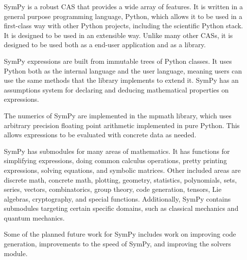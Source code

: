 SymPy is a robust CAS that provides a wide array of features. It is written in
a general purpose programming language, Python, which allows it to be used in
a first-class way with other Python projects, including the scientific Python
stack. It is designed to be used in an extensible way. Unlike many other CASs,
it is designed to be used both as a end-user application and as a library.

SymPy expressions are built from immutable trees of Python classes. It uses
Python both as the internal language and the user language, meaning users can
use the same methods that the library implements to extend it. SymPy has an
assumptions system for declaring and deducing mathematical properties on
expressions.

The numerics of SymPy are implemented in the mpmath library, which uses
arbitrary precision floating point arithmetic implemented in pure Python. This
allows expressions to be evaluated with concrete data as needed.

SymPy has submodules for many areas of mathematics. It has functions for
simplifying expressions, doing common calculus operations, pretty printing
expressions, solving equations, and symbolic matrices. Other included areas
are discrete math, concrete math, plotting, geometry, statistics,
polynomials, sets, series, vectors, combinatorics, group theory, code
generation, tensors, Lie algebras, cryptography, and special functions.
Additionally, SymPy contains submodules targeting certain specific domains,
such as classical mechanics and quantum mechanics.


Some of the planned future work for SymPy includes work on improving code
generation, improvements to the speed of SymPy, and improving the solvers
module.


